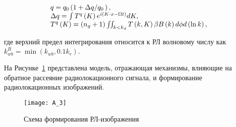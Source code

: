 \begin{equation} \label{A.17} \begin{array}{l} {q=q_{0} \left(1+{\Delta q\mathord{\left/ {\vphantom {\Delta q q_{0} \, }} \right. \kern-\nulldelimiterspace} q_{0} \, } \right),} \\ {\Delta q=\int T^{q} \left(K\right)e^{i\left(K\cdot x-\Omega t\right)}  dK,} \\ {T^{q} \left(K\right)=\left(n_{g} +1\right)\iint \nolimits _{k<k_{d} }T\left(k,K\right)\beta B\left(k\right) d\phi d\left(\ln k\right),} \end{array} \end{equation}



\noindent где верхний предел интегрирования относится к РЛ волновому числу как $k_{wb}^{R} =\min \left(k_{wb} ,0.1k_{r} \right)$.

На Рисунке~\ref{fig:A.3} представлена модель, отражающая механизмы, влияющие на обратное рассеяние радиолокационного сигнала, и формирование радиолокационных изображений.



\begin{figure}[H]
    \texttt{[image: A\_3]}
    \caption{Схема формирования РЛ-изображения}
    \label{fig:A.3}
\end{figure}
